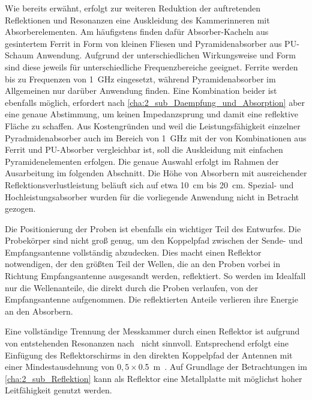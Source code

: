 \par
\vspace{\linespace}
Wie bereits erwähnt, erfolgt zur weiteren Reduktion der auftretenden Reflektionen und Resonanzen eine Auskleidung des Kammerinneren mit Absorberelementen. Am häufigstens finden dafür Absorber-Kacheln aus gesintertem Ferrit in Form von kleinen Fliesen und Pyramidenabsorber aus PU-Schaum Anwendung. Aufgrund der unterschiedlichen Wirkungsweise und Form sind diese jeweils für unterschiedliche Frequenzbereiche geeignet. Ferrite werden bis zu Frequenzen von \SI{1}{\giga\hertz} eingesetzt, während Pyramidenabsorber im Allgemeinen nur darüber Anwendung finden. Eine Kombination beider ist ebenfalls möglich, erfordert nach \Abschnitt\ref{cha:2_sub_Daempfung_und_Absorption} aber eine genaue Abstimmung, um keinen Impedanzsprung und damit eine reflektive Fläche zu schaffen. Aus Kostengründen und weil die Leistungsfähigkeit einzelner Pyradmidenabsorber auch im Bereich von \SI{1}{\giga\hertz} mit der von Kombinationen aus Ferrit und PU-Absorber vergleichbar ist, soll die Auskleidung mit einfachen Pyramidenelementen erfolgen. Die genaue Auswahl erfolgt im Rahmen der Ausarbeitung im folgenden Abschnitt. Die Höhe von Absorbern mit ausreichender Reflektionsverlustleistung beläuft sich auf etwa \SI{10}{\centi\meter} bis \SI{20}{\centi\meter}. Spezial- und Hochleistungsabsorber wurden für die vorliegende Anwendung nicht in Betracht gezogen. 
\par
\vspace{\linespace} 
Die Positionierung der Proben ist ebenfalls ein wichtiger Teil des Entwurfes. Die Probekörper sind nicht groß genug, um den Koppelpfad zwischen der Sende- und Empfangsantenne vollständig abzudecken. Dies macht einen Reflektor notwendigen, der den größten Teil der Wellen, die an den Proben vorbei in Richtung Empfangsantenne ausgesandt werden, reflektiert. So werden im Idealfall nur die Wellenanteile, die direkt durch die Proben verlaufen, von der Empfangsantenne aufgenommen. Die reflektierten Anteile verlieren ihre Energie an den Absorbern.   
\par
\vspace{\linespace}
Eine vollständige Trennung der Messkammer durch einen Reflektor ist aufgrund von entstehenden Resonanzen nach~\cite{Techniques_Shielding_Effectiveness_Far_Field_Simulation} nicht sinnvoll. Entsprechend erfolgt eine Einfügung des Reflektorschirms in den direkten Koppelpfad der Antennen mit einer Mindestausdehnung von $0,5\times$\SI{0.5}{\meter}~\cite{DIN_EN_61000-4-3}. Auf Grundlage der Betrachtungen im \Abschnitt\ref{cha:2_sub_Reflektion} kann als Reflektor eine Metallplatte mit möglichst hoher Leitfähigkeit genutzt werden.
